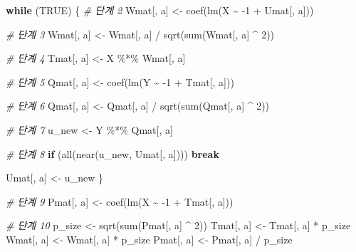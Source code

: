 \documentclass[
]{book}
\newenvironment{Shaded}{\begin{snugshade}}{\end{snugshade}}
\newcommand{\CommentTok}[1]{\textcolor[rgb]{0.56,0.35,0.01}{\textit{#1}}}
\newcommand{\ConstantTok}[1]{\textcolor[rgb]{0.00,0.00,0.00}{#1}}
\newcommand{\ControlFlowTok}[1]{\textcolor[rgb]{0.13,0.29,0.53}{\textbf{#1}}}
\newcommand{\DecValTok}[1]{\textcolor[rgb]{0.00,0.00,0.81}{#1}}
\newcommand{\FunctionTok}[1]{\textcolor[rgb]{0.00,0.00,0.00}{#1}}
\newcommand{\NormalTok}[1]{#1}
\newcommand{\OtherTok}[1]{\textcolor[rgb]{0.56,0.35,0.01}{#1}}
\newcommand{\SpecialCharTok}[1]{\textcolor[rgb]{0.00,0.00,0.00}{#1}}
\begin{document}
\begin{Shaded}
\begin{Highlighting}[]
    \ControlFlowTok{while}\NormalTok{ (}\ConstantTok{TRUE}\NormalTok{) \{}
      \CommentTok{\# 단계 2}
\NormalTok{      Wmat[, a] }\OtherTok{\textless{}{-}} \FunctionTok{coef}\NormalTok{(}\FunctionTok{lm}\NormalTok{(X }\SpecialCharTok{\textasciitilde{}} \SpecialCharTok{{-}}\DecValTok{1} \SpecialCharTok{+}\NormalTok{ Umat[, a]))}
      
      \CommentTok{\# 단계 3}
\NormalTok{      Wmat[, a] }\OtherTok{\textless{}{-}}\NormalTok{ Wmat[, a] }\SpecialCharTok{/} \FunctionTok{sqrt}\NormalTok{(}\FunctionTok{sum}\NormalTok{(Wmat[, a] }\SpecialCharTok{\^{}} \DecValTok{2}\NormalTok{))}
      
      \CommentTok{\# 단계 4}
\NormalTok{      Tmat[, a] }\OtherTok{\textless{}{-}}\NormalTok{ X }\SpecialCharTok{\%*\%}\NormalTok{ Wmat[, a]}
      
      \CommentTok{\# 단계 5}
\NormalTok{      Qmat[, a] }\OtherTok{\textless{}{-}} \FunctionTok{coef}\NormalTok{(}\FunctionTok{lm}\NormalTok{(Y }\SpecialCharTok{\textasciitilde{}} \SpecialCharTok{{-}}\DecValTok{1} \SpecialCharTok{+}\NormalTok{ Tmat[, a]))}
      
      \CommentTok{\# 단계 6}
\NormalTok{      Qmat[, a] }\OtherTok{\textless{}{-}}\NormalTok{ Qmat[, a] }\SpecialCharTok{/} \FunctionTok{sqrt}\NormalTok{(}\FunctionTok{sum}\NormalTok{(Qmat[, a] }\SpecialCharTok{\^{}} \DecValTok{2}\NormalTok{))}
      
      \CommentTok{\# 단계 7}
\NormalTok{      u\_new }\OtherTok{\textless{}{-}}\NormalTok{ Y }\SpecialCharTok{\%*\%}\NormalTok{ Qmat[, a]}
      
      \CommentTok{\# 단계 8}
      \ControlFlowTok{if}\NormalTok{ (}\FunctionTok{all}\NormalTok{(}\FunctionTok{near}\NormalTok{(u\_new, Umat[, a]))) }\ControlFlowTok{break}
      
\NormalTok{      Umat[, a] }\OtherTok{\textless{}{-}}\NormalTok{ u\_new}
\NormalTok{    \}}

    \CommentTok{\# 단계 9}
\NormalTok{    Pmat[, a] }\OtherTok{\textless{}{-}} \FunctionTok{coef}\NormalTok{(}\FunctionTok{lm}\NormalTok{(X }\SpecialCharTok{\textasciitilde{}} \SpecialCharTok{{-}}\DecValTok{1} \SpecialCharTok{+}\NormalTok{ Tmat[, a]))}
    
    \CommentTok{\# 단계 10}
\NormalTok{    p\_size }\OtherTok{\textless{}{-}} \FunctionTok{sqrt}\NormalTok{(}\FunctionTok{sum}\NormalTok{(Pmat[, a] }\SpecialCharTok{\^{}} \DecValTok{2}\NormalTok{))}
\NormalTok{    Tmat[, a] }\OtherTok{\textless{}{-}}\NormalTok{ Tmat[, a] }\SpecialCharTok{*}\NormalTok{ p\_size}
\NormalTok{    Wmat[, a] }\OtherTok{\textless{}{-}}\NormalTok{ Wmat[, a] }\SpecialCharTok{*}\NormalTok{ p\_size}
\NormalTok{    Pmat[, a] }\OtherTok{\textless{}{-}}\NormalTok{ Pmat[, a] }\SpecialCharTok{/}\NormalTok{ p\_size}
    

\end{Highlighting}
\end{Shaded}
\end{document}
